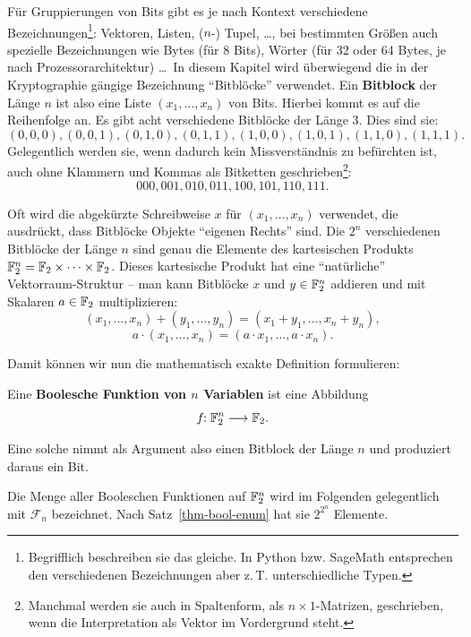 \begin{refsegment}
Für Gruppierungen von Bits gibt es je nach Kontext verschiedene
Bezeichnungen\footnote{%
   Begrifflich beschreiben sie das gleiche. In Python bzw. SageMath
   entsprechen den verschiedenen Bezeichnungen aber z.\,T. unterschiedliche
   Typen.
}:
Vektoren, Listen, ($n$-) Tupel,
\ldots, bei bestimmten Größen auch spezielle Bezeichnungen wie Bytes
(für 8 Bits), Wörter (für 32 oder
64 Bytes, je nach Prozessorarchitektur) \ldots\
In diesem Kapitel wird überwiegend
die in der Kryptographie gängige Bezeichnung "`Bitblöcke"' verwendet.
Ein \textbf{Bitblock} der Länge $n$ ist also eine Liste $(x_1, \ldots, x_n)$ von
Bits. Hierbei kommt es auf die Reihenfolge an. Es gibt acht
verschiedene Bitblöcke der Länge $3$. Dies sind sie:
\[
   (0,0,0), (0,0,1), (0,1,0), (0,1,1), (1,0,0), (1,0,1), (1,1,0), (1,1,1).
\]
Gelegentlich werden sie, wenn dadurch kein Missverständnis zu befürchten ist, auch
ohne Klammern und Kommas als Bitketten\index{Bitkette} geschrieben\footnote{%
   Manchmal werden sie auch in Spaltenform, als $n \times 1$-Matrizen,
   geschrieben, wenn die Interpretation als Vektor\index{Vektor} im Vordergrund steht.
}:
\[
   000, 001, 010, 011, 100, 101, 110, 111.
\]

Oft wird die abgekürzte Schreibweise $x$ für $(x_1, \ldots, x_n)$ verwendet,
die ausdrückt, dass
Bitblöcke Objekte "`eigenen Rechts"' sind. Die $2^n$ verschiedenen
Bitblöcke der Länge $n$ sind genau die Elemente des kartesischen Produkts
$\mathbb{F}_2^n = \mathbb{F}_2 \times \cdots \times \mathbb{F}_2$. Dieses kartesische Produkt
hat eine "`natürliche"' Vektorraum-Struktur\index{Vektorraum} -- man kann Bitblöcke
$x$ und $y \in \mathbb{F}_2^n$ addieren und mit Skalaren $a \in \mathbb{F}_2$ multiplizieren:
\[
   (x_1, \ldots, x_n) + (y_1, \ldots, y_n) =  (x_1 + y_1, \ldots, x_n + y_n),
\]
\[
   a \cdot (x_1, \ldots, x_n) = (a \cdot x_1, \ldots, a \cdot x_n).
\]

Damit können wir nun die mathematisch exakte Definition formulieren:

\begin{definition}\label{def-bool-fkt}
  Eine \textbf{Boolesche Funktion von $n$ Variablen} ist eine Abbildung
\[
     f\!\!: \mathbb{F}_2^n \longrightarrow \mathbb{F}_2.
\]
\end{definition}
Eine solche nimmt als Argument also einen Bitblock der Länge $n$
und produziert daraus ein Bit.

Die Menge aller Booleschen Funktionen auf $\mathbb{F}_2^n$ wird im Folgenden gelegentlich
mit $\mathcal{F}_n$ bezeichnet. Nach Satz~\ref{thm-bool-enum} hat sie
$2^{2^n}$ Elemente.


\end{refsegment}
